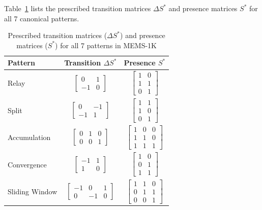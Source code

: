 \documentclass[sigconf,review,anonymous]{acmart}
\begin{document}
Table~\ref{tab:delta_s} lists the prescribed transition matrices $\Delta S^*$ and presence matrices $S^*$ for all 7 canonical patterns.
\begin{table}[H]
\caption{Prescribed transition matrices ($\Delta S^*$) and presence matrices ($S^*$) for all 7 patterns in MEMS-1K}
\label{tab:delta_s}
\centering
\small
\renewcommand{\arraystretch}{1.2}
\setlength{\tabcolsep}{8pt}
\begin{tabular}{@{}lcc@{}}
\toprule
Pattern & Transition $\Delta S^*$ & Presence $S^*$ \\
\midrule
Relay &
$\begin{bmatrix} 0 & 1 \\ -1 & 0 \end{bmatrix}$ &
$\begin{bmatrix} 1 & 0 \\ 1 & 1 \\ 0 & 1 \end{bmatrix}$ \\[12pt]

Split &
$\begin{bmatrix} 0 & -1 \\ -1 & 1 \end{bmatrix}$ &
$\begin{bmatrix} 1 & 1 \\ 1 & 0 \\ 0 & 1 \end{bmatrix}$ \\[12pt]

Accumulation &
$\begin{bmatrix} 0 & 1 & 0 \\ 0 & 0 & 1 \end{bmatrix}$ &
$\begin{bmatrix} 1 & 0 & 0 \\ 1 & 1 & 0 \\ 1 & 1 & 1 \end{bmatrix}$ \\[12pt]

Convergence &
$\begin{bmatrix} -1 & 1 \\ 1 & 0 \end{bmatrix}$ &
$\begin{bmatrix} 1 & 0 \\ 0 & 1 \\ 1 & 1 \end{bmatrix}$ \\[12pt]

Sliding Window &
$\begin{bmatrix} -1 & 0 & 1 \\ 0 & -1 & 0 \end{bmatrix}$ &
$\begin{bmatrix} 1 & 1 & 0 \\ 0 & 1 & 1 \\ 0 & 0 & 1 \end{bmatrix}$ \\[12pt]


\end{tabular}
\end{table}
\end{document}
